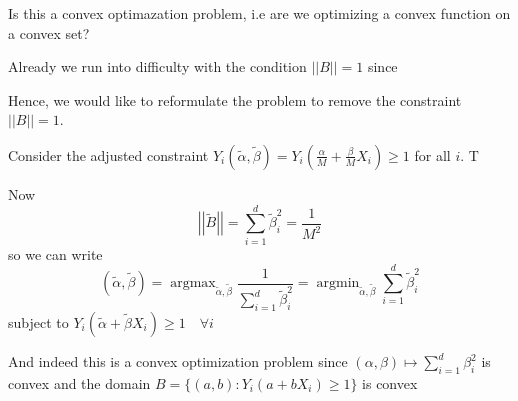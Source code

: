 \documentclass[12pt]{report}
\newcommand{\norm}[1]{\left\vert\left\vert #1 \right\vert\right\vert}
\DeclareMathOperator*{\argmax}{\arg\max}
\DeclareMathOperator*{\argmin}{\arg\min}
\begin{document}
Is this a convex optimazation problem, i.e are we optimizing a convex function on a convex set?

Already we run into difficulty with the condition $\norm B = 1$ since

\begin{center}
	\hspace{1cm}
\end{center}

Hence, we would like to reformulate the problem to remove the constraint $\norm B = 1$.

Consider the adjusted constraint $Y_i(\tilde \alpha, \tilde \beta) = Y_i(\frac{\alpha}{M} + \frac{\beta}{M} X_i) \geq 1$ for all $i$. T

Now
\[\norm{\tilde B} = \sum_{i=1}^{d} \tilde \beta_i^2 = \frac{1}{M^2}\]
so we can write
\[(\tilde \alpha, \tilde \beta) = \argmax_{\tilde \alpha, \tilde \beta} \frac{1}{\sum_{i=1}^{d} \tilde \beta_i^2 } = \argmin_{\tilde \alpha, \tilde \beta} \sum_{i=1}^{d} \tilde \beta_i^2 \]
subject to $Y_i(\tilde \alpha + \tilde \beta X_i) \geq 1\quad \forall i$

And indeed this is a convex optimization problem since $(\alpha, \beta) \mapsto \sum_{i=1}^d \beta_i^2$ is convex and the domain $B= \{(a, b): Y_i(a + b X_i) \geq 1\}$ is convex
\end{document}
